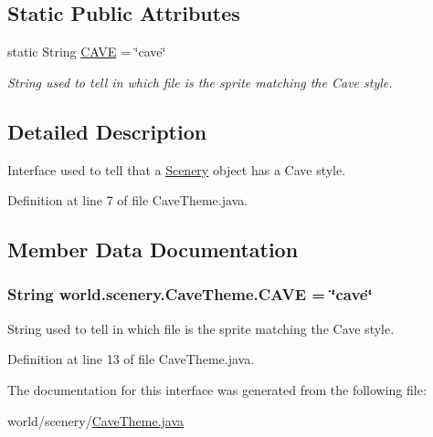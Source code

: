 \subsection*{Static Public Attributes}
\begin{DoxyCompactItemize}
\item 
static String \hyperlink{interfaceworld_1_1scenery_1_1_cave_theme_abbad3655c1d1f230dddfd7ecc5194f50}{C\-A\-V\-E} = \char`\"{}cave\char`\"{}
\begin{DoxyCompactList}\small\item\em String used to tell in which file is the sprite matching the Cave style. \end{DoxyCompactList}\end{DoxyCompactItemize}


\subsection{Detailed Description}
Interface used to tell that a \hyperlink{classworld_1_1scenery_1_1_scenery}{Scenery} object has a Cave style. 

Definition at line 7 of file Cave\-Theme.\-java.



\subsection{Member Data Documentation}
\hypertarget{interfaceworld_1_1scenery_1_1_cave_theme_abbad3655c1d1f230dddfd7ecc5194f50}{
\subsubsection[{C\-A\-V\-E}]{\setlength{\rightskip}{0pt plus 5cm}String world.\-scenery.\-Cave\-Theme.\-C\-A\-V\-E = \char`\"{}cave\char`\"{}\hspace{0.3cm}{\ttfamily [static]}}}\label{interfaceworld_1_1scenery_1_1_cave_theme_abbad3655c1d1f230dddfd7ecc5194f50}


String used to tell in which file is the sprite matching the Cave style. 



Definition at line 13 of file Cave\-Theme.\-java.



The documentation for this interface was generated from the following file\-:\begin{DoxyCompactItemize}
\item 
world/scenery/\hyperlink{_cave_theme_8java}{Cave\-Theme.\-java}\end{DoxyCompactItemize}
